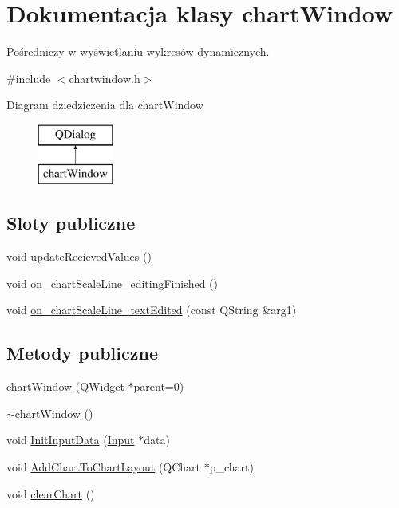 \hypertarget{classchart_window}{}\section{Dokumentacja klasy chart\+Window}
\label{classchart_window}


Pośredniczy w wyświetlaniu wykresów dynamicznych.  




{\ttfamily \#include $<$chartwindow.\+h$>$}

Diagram dziedziczenia dla chart\+Window\begin{figure}[H]
\begin{center}
\leavevmode
\includegraphics[height=2.000000cm]{classchart_window}
\end{center}
\end{figure}
\subsection*{Sloty publiczne}
\begin{DoxyCompactItemize}
\item 
void \hyperlink{classchart_window_a1f30b298ec6887e7c2e8c9d52a5884c7}{update\+Recieved\+Values} ()
\item 
void \hyperlink{classchart_window_a67c85480505858e1a9397c39b7704be4}{on\+\_\+chart\+Scale\+Line\+\_\+editing\+Finished} ()
\item 
void \hyperlink{classchart_window_ad507249e467a8428725a6993df9e241d}{on\+\_\+chart\+Scale\+Line\+\_\+text\+Edited} (const Q\+String \&arg1)
\end{DoxyCompactItemize}
\subsection*{Metody publiczne}
\begin{DoxyCompactItemize}
\item 
\hyperlink{classchart_window_a3e5f564f088a1159e1da8a8d9d970e76}{chart\+Window} (Q\+Widget $\ast$parent=0)
\item 
\hyperlink{classchart_window_a83ab3ef7c1682d56593464d3949ca00a}{$\sim$chart\+Window} ()
\item 
void \hyperlink{classchart_window_ab574e80c2d8edcc06f6d0f0d7e843168}{Init\+Input\+Data} (\hyperlink{class_input}{Input} $\ast$data)
\item 
void \hyperlink{classchart_window_aea050d10a2c8706e3ff0e468344380b0}{Add\+Chart\+To\+Chart\+Layout} (Q\+Chart $\ast$p\+\_\+chart)
\item 
void \hyperlink{classchart_window_a654c2fa3ffd7ddf0465b150e2d070355}{clear\+Chart} ()
\end{DoxyCompactItemize}

